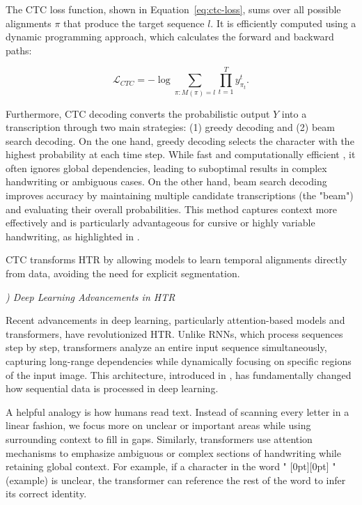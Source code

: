 \documentclass[conference]{IEEEtran}
\newcommand{\artext}[1]{%
  {\fontsize{8pt}{11pt}\selectfont \raisebox{0pt}[0pt][0pt]{\RL{#1}}}%
}
\newcounter{customsubsubsection} %
\renewcommand{\subsubsection}[1]{%
  \stepcounter{customsubsubsection}%
  \vspace{0.5em} %
  \textit{\arabic{customsubsubsection}) #1}%
  \vspace{0.5em} %
}
\begin{document}
The CTC loss function, shown in Equation~\ref{eq:ctc-loss}, sums over all possible alignments \( \pi \) that produce the target sequence \( l \). It is efficiently computed using a dynamic programming approach, which calculates the forward and backward paths:

\begin{equation}
  \mathcal{L}_{CTC} = -\log \sum_{\pi : M(\pi) = l} \prod_{t=1}^T y^{t}_{\pi_t}.
  \label{eq:ctc-loss}
  \end{equation}

Furthermore, CTC decoding converts the probabilistic output \( Y \) into a transcription through two main strategies: (1) greedy decoding and (2) beam search decoding. On the one hand, greedy decoding selects the character with the highest probability at each time step. While fast and computationally efficient \cite{graves2006connectionist}, it often ignores global dependencies, leading to suboptimal results in complex handwriting or ambiguous cases. On the other hand, beam search decoding improves accuracy by maintaining multiple candidate transcriptions (the "beam") and evaluating their overall probabilities. This method captures context more effectively and is particularly advantageous for cursive or highly variable handwriting, as highlighted in \cite{praneetha2023handwritten, shi2016endtoend}.


CTC transforms HTR by allowing models to learn temporal alignments directly from data, avoiding the need for explicit segmentation. 

\subsubsection{Deep Learning Advancements in HTR}

Recent advancements in deep learning, particularly attention-based models and transformers, have revolutionized HTR. Unlike RNNs, which process sequences step by step, transformers analyze an entire input sequence simultaneously, capturing long-range dependencies while dynamically focusing on specific regions of the input image. This architecture, introduced in \cite{vaswani2017attention}, has fundamentally changed how sequential data is processed in deep learning.

A helpful analogy is how humans read text. Instead of scanning every letter in a linear fashion, we focus more on unclear or important areas while using surrounding context to fill in gaps. Similarly, transformers use attention mechanisms to emphasize ambiguous or complex sections of handwriting while retaining global context. For example, if a character in the word "\artext{مثال}" (example) is unclear, the transformer can reference the rest of the word to infer its correct identity.
\end{document}
